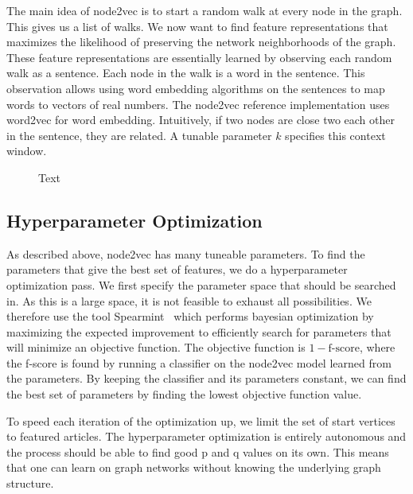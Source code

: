 The main idea of node2vec is to start a random walk at every node in the graph. This gives us a list of walks. We now want to find feature representations that maximizes the likelihood of preserving the network neighborhoods of the graph. These feature representations are essentially learned by observing each random walk as a sentence. Each node in the walk is a word in the sentence. This observation allows using word embedding algorithms on the sentences to map words to vectors of real numbers. The node2vec reference implementation uses word2vec for word embedding. Intuitively, if two nodes are close two each other in the sentence, they are related. A tunable parameter $k$ specifies this context window. 



\begin{figure}[tbp]%
  \centering
  

\caption[short desc]{Text}%
\label{fig:n2v-figure}%
\end{figure}


\subsection{Hyperparameter Optimization}
As described above, node2vec has many tuneable parameters. To find the parameters that give the best set of features, we do a hyperparameter optimization pass. We first specify the parameter space that should be searched in. As this is a large space, it is not feasible to exhaust all possibilities. We therefore use the tool Spearmint~\cite{snoek2012practical} which performs bayesian optimization by maximizing the expected improvement to efficiently search for parameters that will minimize an objective function. The objective function is $1 - \text{f-score}$, where the f-score is found by running a classifier on the node2vec model learned from the parameters. By keeping the classifier and its parameters constant, we can find the best set of parameters by finding the lowest objective function value.

To speed each iteration of the optimization up, we limit the set of start vertices to featured articles. The hyperparameter optimization is entirely autonomous and the process should be able to find good p and q values on its own. This means that one can learn on graph networks without knowing the underlying graph structure.

